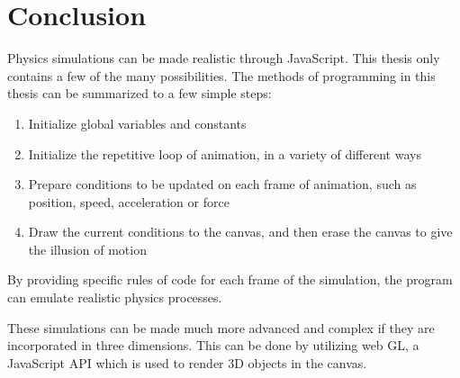 
\chapter{Conclusion} %

\label{Conclusion} %




Physics simulations can be made realistic through JavaScript.  This thesis only contains a few of the many possibilities.  The methods of programming in this thesis can be summarized to a few simple steps:

\begin{enumerate}  
\item Initialize global variables and constants
\item Initialize the repetitive loop of animation, in a variety of different ways
\item Prepare conditions to be updated on each frame of animation, such as position, speed, acceleration or force
\item Draw the current conditions to the canvas, and then erase the canvas to give the illusion of motion
\end{enumerate} 

By providing specific rules of code for each frame of the simulation, the program can emulate realistic physics processes.   




These simulations can be made much more advanced and complex if they are incorporated in three dimensions.  This can be done by utilizing web GL, a JavaScript API which is used to render 3D objects in the canvas.  


































